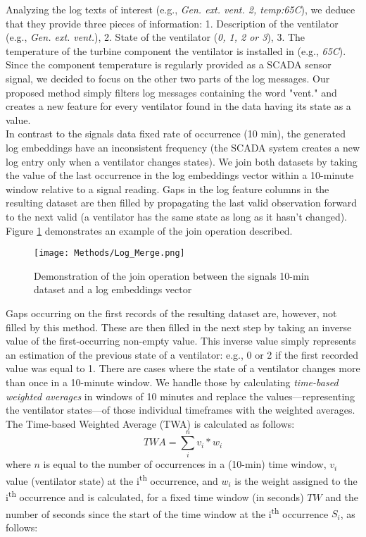     Analyzing the log texts of interest (e.g., \emph{Gen. ext. vent. 2, temp:65\degree C}), we deduce that they provide three pieces of information: 
    1. Description of the ventilator (e.g., \emph{Gen. ext. vent.}), 2. State of the ventilator (\emph{0, 1, 2 or 3}), 
    3. The temperature of the turbine component the ventilator is installed in (e.g., \emph{65\degree C}).
    Since the component temperature is regularly provided as a SCADA sensor signal, we decided to focus on the other two parts of the log messages. 
    Our proposed method simply filters log messages containing the word "vent." and creates a new feature for every ventilator found in the data having its state as a value.\\
    In contrast to the signals data fixed rate of occurrence (10 min), the generated log embeddings have an inconsistent frequency (the SCADA system creates a new log entry only 
    when a ventilator changes states). We join both datasets by taking the value of the last occurrence in the log embeddings vector within a 10-minute window relative to a signal reading.
    Gaps in the log feature columns in the resulting dataset are then filled by propagating the last valid observation forward to the next valid (a ventilator has the same state as long as it hasn't changed).
    Figure \ref{fig:log-merge} demonstrates an example of the join operation described. 

    \begin{figure}[H]
      \begin{center}
        \texttt{[image: Methods/Log\_Merge.png]}
      \end{center}
      \caption{Demonstration of the join operation between the signals 10-min dataset and a log embeddings vector}
      \label{fig:log-merge}
    \end{figure}

    Gaps occurring on the first records of the resulting dataset are, however, not filled by this 
    method. These are then filled in the next step by taking an inverse value of the first-occurring non-empty value. This inverse value simply represents an estimation of 
    the previous state of a ventilator: e.g., 0 or 2 if the first recorded value was equal to 1. There are cases where the state of 
    a ventilator changes more than once in a 10-minute window. We handle those by calculating \emph{time-based weighted averages} in windows of 10 minutes and replace 
    the values---representing the ventilator states---of those individual timeframes with the weighted averages. The Time-based Weighted Average (TWA) is calculated as follows:
    \begin{equation}
      TWA = \sum_{i}^{n} v_i * w_i
    \end{equation}
    where $n$ is equal to the number of occurrences in a (10-min) time window, $v_i$ value (ventilator state) at the i\textsuperscript{th} occurrence, 
    and $w_i$ is the weight assigned to the i\textsuperscript{th} occurrence and is calculated, for a fixed time window (in seconds) $TW$ and 
    the number of seconds since the start of the time window at the i\textsuperscript{th} occurrence $S_i$, as follows:

